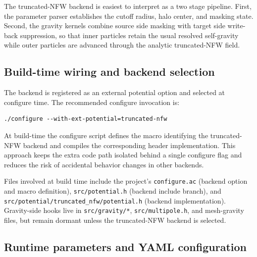 The truncated-NFW backend is easiest to interpret as a two stage pipeline. First, the parameter parser establishes the cutoff radius, halo center, and masking state. Second, the gravity kernels combine source side masking with target side write-back suppression, so that inner particles retain the usual resolved self-gravity while outer particles are advanced through the analytic truncated-NFW field.



\subsection{Build-time wiring and backend selection}

The backend is registered as an external potential option and selected at configure time. The recommended configure invocation is:

\begin{verbatim}
./configure --with-ext-potential=truncated-nfw
\end{verbatim}

At build-time the configure script defines the macro identifying the truncated-NFW backend and compiles the corresponding header implementation. This approach keeps the extra code path isolated behind a single configure flag and reduces the risk of accidental behavior changes in other backends.

Files involved at build time include the project's \texttt{configure.ac} (backend option and macro definition), \texttt{src/potential.h} (backend include branch), and \texttt{src/potential/truncated\_nfw/potential.h} (backend implementation). Gravity-side hooks live in \texttt{src/gravity/*}, \texttt{src/multipole.h}, and mesh-gravity files, but remain dormant unless the truncated-NFW backend is selected.

\subsection{Runtime parameters and YAML configuration}

